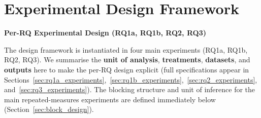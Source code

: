 \section{Experimental Design Framework}

\noindent\textbf{Per-RQ Experimental Design (RQ1a, RQ1b, RQ2, RQ3)}
\label{sec:per_rq_design}

\newcommand{\rqMiniFlow}[1]{%
\begin{tikzpicture}[
    font=\scriptsize,
    rqbox/.style={draw, rounded corners=2pt, fill=gray!10, inner sep=3pt, minimum height=1.3cm, minimum width=1.8cm, text width=1.6cm, align=center},
    rqarrow/.style={-{Stealth[length=2mm]}, line width=0.4pt},
]
    \def\xsep{2.1}
    \foreach \txt [count=\i] in {#1} {%
        \node[rqbox] (rq\i) at ({(\i-1)*\xsep},0) {\txt};
        \ifnum\i>1
            \pgfmathtruncatemacro{\j}{\i-1}
            \draw[rqarrow] (rq\j.east) -- (rq\i.west);
        \fi
    }%
\end{tikzpicture}%
}

The design framework is instantiated in four main experiments (RQ1a, RQ1b, RQ2, RQ3). We summarise the \textbf{unit of analysis}, \textbf{treatments}, \textbf{datasets}, and \textbf{outputs} here to make the per-RQ design explicit (full specifications appear in Sections~\ref{sec:rq1a_experiments},~\ref{sec:rq1b_experiments},~\ref{sec:rq2_experiments}, and~\ref{sec:rq3_experiments}). The blocking structure and unit of inference for the main repeated-measures experiments are defined immediately below (Section~\ref{sec:block_design}).

